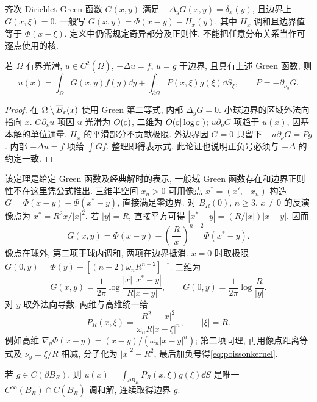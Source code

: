 \label{ch:green}
\begin{definition}
齐次 Dirichlet Green 函数 $G(x,y)$ 满足 $-\Delta_yG(x,y)=\delta_x(y)$, 且边界上 $G(x,\xi)=0$. 一般写 $G(x,y)=\Phi(x-y)-H_x(y)$, 其中 $H_x$ 调和且边界值等于 $\Phi(x-\xi)$. 定义中仍需规定奇异部分及正则性, 不能把任意分布关系当作可逐点使用的核.
\end{definition}
\begin{theorem}\label{thm:greenrepresentation}
若 $\Omega$ 有界光滑, $u\in C^2(\overline\Omega)$, $-\Delta u=f$, $u=g$ 于边界, 且具有上述 Green 函数, 则
\[
u(x)=\int_\Omega G(x,y)f(y)\dd y+\int_{\partial\Omega}P(x,\xi)g(\xi)\dd S_\xi,
\qquad P=-\partial_{\nu_y}G.
\]
\end{theorem}
\begin{proof}
在 $\Omega\setminus\overline B_\varepsilon(x)$ 使用 Green 第二等式, 内部 $\Delta_yG=0$. 小球边界的区域外法向指向 $x$. $G\partial_\nu u$ 项因 $u$ 光滑为 $O(\varepsilon)$, 二维为 $O(\varepsilon|\log\varepsilon|)$; $u\partial_\nu G$ 项趋于 $u(x)$, 因基本解的单位通量. $H_x$ 的平滑部分不贡献极限. 外边界因 $G=0$ 只留下 $-u\partial_\nu G=P g$. 内部 $-\Delta u=f$ 项给 $\int Gf$. 整理即得表示式. 此论证也说明正负号必须与 $-\Delta$ 的约定一致.
\end{proof}
该定理是给定 Green 函数及经典解时的表示, 一般域 Green 函数存在和边界正则性不在这里凭公式推出. 三维半空间 $x_n>0$ 可用像点 $x^*=(x',-x_n)$ 构造 $G=\Phi(x-y)-\Phi(x^*-y)$, 直接满足零边界.
对 $B_R(0)$, $n\ge3$, $x\ne0$ 的反演像点为 $x^*=R^2x/|x|^2$. 若 $|y|=R$, 直接平方可得 $|x^*-y|=(R/|x|)|x-y|$. 因而
\[
G(x,y)=\Phi(x-y)-\left(\frac R{|x|}\right)^{n-2}\Phi(x^*-y).
\]
像点在球外, 第二项于球内调和, 两项在边界抵消. $x=0$ 时取极限 $G(0,y)=\Phi(y)-[(n-2)\omega_nR^{n-2}]^{-1}$. 二维为
\[
G(x,y)=\frac1{2\pi}\log\frac{|x|\,|x^*-y|}{R|x-y|},\qquad
G(0,y)=\frac1{2\pi}\log\frac R{|y|}.
\]
对 $y$ 取外法向导数, 两维与高维统一给
\begin{equation}\label{eq:poissonkernel}
P_R(x,\xi)=\frac{R^2-|x|^2}{\omega_nR|x-\xi|^n},\qquad |\xi|=R.
\end{equation}
例如高维 $\nabla_y\Phi(x-y)=(x-y)/(\omega_n|x-y|^n)$; 第二项同理, 再用像点距离等式及 $\nu_y=\xi/R$ 相减, 分子化为 $|x|^2-R^2$, 最后加负号得\eqref{eq:poissonkernel}.
\begin{theorem}\label{thm:poissonball}
若 $g\in C(\partial B_R)$, 则 $u(x)=\int_{\partial B_R}P_R(x,\xi)g(\xi)\dd S$ 是唯一 $C^\infty(B_R)\cap C(\overline B_R)$ 调和解, 连续取得边界 $g$.
\end{theorem}
